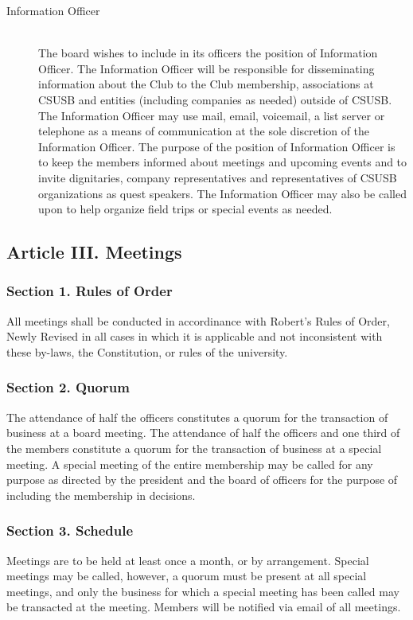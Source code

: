 \documentclass{article}
\begin{document}
\begin{description}
        \item[Information Officer] ~\\
           The board wishes to include in its officers the position of Information Officer. The Information Officer will be responsible for disseminating information about the Club to the Club membership, associations at CSUSB and entities (including companies as needed) outside of CSUSB.  The Information Officer may use mail, email, voicemail, a list server or telephone as a means of communication at the sole discretion of the Information Officer. The purpose of the position of Information Officer is to keep the members informed about meetings and upcoming events and to invite dignitaries, company representatives and representatives of CSUSB organizations as quest speakers.  The Information Officer may also be called upon to help organize field trips or special events as needed.
        \end{description}



  \subsection{Article III. Meetings}

    \subsubsection{Section 1. Rules of Order}
      All meetings shall be conducted in accordinance with Robert's Rules of Order, Newly Revised in all cases in which it is applicable and not inconsistent with these by-laws, the Constitution, or rules of the university.

    \subsubsection{Section 2. Quorum}
      The attendance of half the officers constitutes a quorum for the transaction of business at a board meeting. The attendance of half the officers and one third of the members constitute a quorum for the transaction of business at a special meeting. A special meeting of the entire membership may be called for any purpose as directed by the president and the board of officers for the purpose of including the membership in decisions.

    \subsubsection{Section 3. Schedule}
      Meetings are to be held at least once a month, or by arrangement. Special meetings may be called, however, a quorum must be present at all special meetings, and only the business for which a special meeting has been called may be transacted at the meeting. Members will be notified via email of all meetings.
\end{document}
